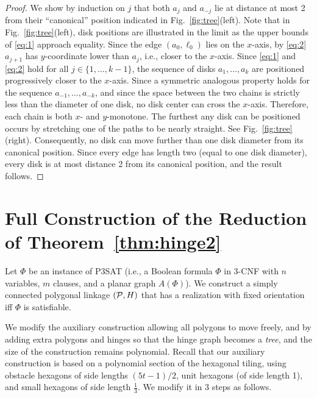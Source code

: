 \documentclass[runningheads]{article}
\newcommand{\PP}{{\cal P}} %
\begin{document}
\begin{proof}
We show by induction on $j$ that both $a_j$ and $a_{-j}$ lie at distance
at most 2 from their ``canonical'' position indicated
in Fig.~\ref{fig:tree}(left).
Note that in Fig.~\ref{fig:tree}(left), disk positions are illustrated
in the limit as the upper bounds of \eqref{eq:1} approach equality.
Since the edge $(a_0,\ell_0)$ lies on the $x$-axis,
by \eqref{eq:2} $a_{j+1}$ has $y$-coordinate lower than $a_j$,
i.e., closer to the $x$-axis.
Since \eqref{eq:1} and \eqref{eq:2} hold for all $j \in \{1, \ldots, k-1\}$,
the sequence of disks $a_1, \ldots, a_k$ are positioned progressively
closer to the $x$-axis. Since a symmetric analogous property holds
for the sequence $a_{-1}, \ldots, a_{-k}$,
and since the space between the two chains is strictly less than the diameter of
one disk, no disk center can cross the $x$-axis.
Therefore, each chain is both $x$- and $y$-monotone.
The furthest any disk can be positioned occurs by stretching
one of the paths to be nearly straight.
See Fig.~\ref{fig:tree}(right).
Consequently, no disk can move further than one disk
diameter from its canonical position.
Since every edge has length two (equal to one disk diameter),
every disk is at most distance 2 from its canonical position,
and the result follows.
\end{proof}



\clearpage
\section{Full Construction of the Reduction of Theorem~\ref{thm:hinge2}}
\label{app:full}
Let $\Phi$ be an instance of P3SAT (i.e., a Boolean formula $\Phi$
in 3-CNF with $n$ variables, $m$ clauses, and a planar graph $A(\Phi)$).
We construct a simply connected polygonal linkage $(\PP,H)$ that has a
realization with fixed orientation iff $\Phi$ is satisfiable.

We modify the auxiliary construction allowing all polygons to move freely, and by adding extra polygons and hinges so that the hinge graph becomes a \emph{tree}, and the size of the construction remains polynomial. Recall that our auxiliary construction is based on a polynomial section of the hexagonal tiling, using obstacle hexagons of side lengths $(5t-1)/2$, unit hexagons (of side length 1), and small hexagons of side length $\frac{1}{3}$. We modify it in 3 steps as follows.
\end{document}
